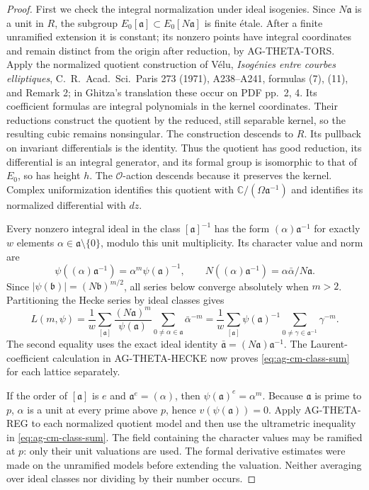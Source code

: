 \begin{proof}
First we check the integral normalization under ideal isogenies.
Since $N\mathfrak a$ is a unit in $R$, the subgroup
$E_0[\mathfrak a]\subset E_0[N\mathfrak a]$ is finite
\'etale. After a finite unramified extension it is constant;
its nonzero points have integral coordinates and remain distinct
from the origin after reduction, by AG-THETA-TORS. Apply the
normalized quotient construction of V\'elu, \emph{Isog\'enies
entre courbes elliptiques}, C.~R.~Acad.~Sci.~Paris 273 (1971),
A238--A241, formulas (7), (11), and Remark 2; in Ghitza's
translation these occur on PDF pp.~2, 4. Its coefficient formulas
are integral polynomials in the kernel coordinates. Their reductions
construct the quotient by the reduced, still separable kernel,
so the resulting cubic remains nonsingular. The construction
descends to $R$. Its pullback on invariant differentials is the
identity. Thus the quotient has good reduction, its differential
is an integral generator, and its formal group is isomorphic to
that of $E_0$, so has height $h$. The $\mathcal O$-action descends
because it preserves the kernel. Complex uniformization identifies
this quotient with $\mathbb C/(\Omega\mathfrak a^{-1})$ and
identifies its normalized differential with $dz$.

Every nonzero integral ideal in the class $[\mathfrak a]^{-1}$
has the form $(\alpha)\mathfrak a^{-1}$ for exactly $w$
elements $\alpha\in\mathfrak a\setminus\{0\}$, modulo this
unit multiplicity. Its character value and norm are
\[
 \psi((\alpha)\mathfrak a^{-1})
       =\alpha^m\psi(\mathfrak a)^{-1},\qquad
 N((\alpha)\mathfrak a^{-1})
       =\alpha\bar\alpha/N\mathfrak a.
\]
Since $|\psi(\mathfrak b)|=(N\mathfrak b)^{m/2}$, all series
below converge absolutely when $m>2$. Partitioning the Hecke
series by ideal classes gives
\[
 L(m,\psi)=\frac1w\sum_{[\mathfrak a]}
  \frac{(N\mathfrak a)^m}{\psi(\mathfrak a)}
      \sum_{0\ne\alpha\in\mathfrak a}\bar\alpha^{-m}
 =\frac1w\sum_{[\mathfrak a]}\psi(\mathfrak a)^{-1}
      \sum_{0\ne\gamma\in\mathfrak a^{-1}}\gamma^{-m}.
\]
The second equality uses the exact ideal identity
$\bar{\mathfrak a}=(N\mathfrak a)\mathfrak a^{-1}$.
The Laurent-coefficient calculation in AG-THETA-HECKE now proves
\eqref{eq:ag-cm-class-sum} for each lattice separately.

If the order of $[\mathfrak a]$ is $e$ and
$\mathfrak a^e=(\alpha)$, then
$\psi(\mathfrak a)^e=\alpha^m$. Because $\mathfrak a$ is prime
to $p$, $\alpha$ is a unit at every prime above $p$, hence
$v(\psi(\mathfrak a))=0$. Apply AG-THETA-REG to each normalized
quotient model and then use the ultrametric inequality in
\eqref{eq:ag-cm-class-sum}. The field containing the character
values may be ramified at $p$: only their unit valuations are
used. The formal derivative estimates were made on the unramified
models before extending the valuation. Neither averaging over
ideal classes nor dividing by their number occurs.
\end{proof}

